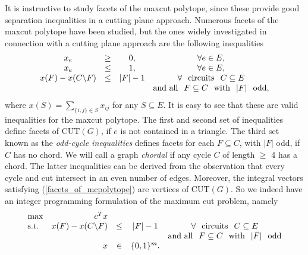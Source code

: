 \documentclass[12pt]{article}
\begin{document}
It is instructive to study facets of the maxcut polytope,
since these provide good separation
inequalities in a cutting plane approach. Numerous facets of the maxcut polytope have been studied,
but the ones widely investigated in connection with a cutting plane approach are the following inequalities
\begin{eqnarray}
\label{facets_of_mcpolytope}
\begin{array}{cccc}
x_e & \ge & 0, & \forall e \in E, \\
x_e & \le & 1, & \forall e \in E, \\
x(F) - x(C \backslash F) & \le & |F| - 1 & \forall \hspace*{0.25cm} \mbox{circuits} \hspace*{0.25cm} C \subseteq E \\
& & & \mbox{and all} \hspace*{0.25cm} F \subseteq C
\hspace*{0.25cm} \mbox{with} \hspace*{0.25cm} |F| \hspace*{0.25cm}
\mbox{odd},
\end{array}
\end{eqnarray}
where $x(S) = \displaystyle \sum_{\{i,j\} \in S} x_{ij}$ for any $
S \subseteq E$. It is easy to see that these are valid
inequalities for the maxcut polytope. The first and second set of
inequalities define facets of $\mbox{CUT}(G)$, if $e$ is not
contained in a triangle. The third set known as the {\em odd-cycle
inequalities} defines facets for each $F \subseteq C$, with $|F|$
odd, if $C$ has no chord. We will call a graph {\em chordal} if
any cycle $C$ of length $\ge$ 4 has a chord. The latter
inequalities can be derived from the observation that every cycle
and cut intersect in an even number of edges. Moreover, the
integral vectors satisfying (\ref{facets_of_mcpolytope}) are
vertices of $\mbox{CUT}(G)$. So we indeed have an integer
programming formulation of the maximum cut problem, namely
\begin{eqnarray}
\label{maxcut_as_01ip}
\begin{array}{lrccc}
\max & c^Tx \\
\mbox{s.t.} & x(F) - x(C \backslash F) & \le & |F| - 1 & \forall \hspace*{0.25cm} \mbox{circuits} \hspace*{0.25cm} C \subseteq E \\
& & & & \mbox{and all} \hspace*{0.25cm} F \subseteq C \hspace*{0.25cm} \mbox{with} \hspace*{0.25cm} |F| \hspace*{0.25cm} \mbox{odd} \\
& x & \in & \{0,1\}^m.
\end{array}
\end{eqnarray}
\end{document}
